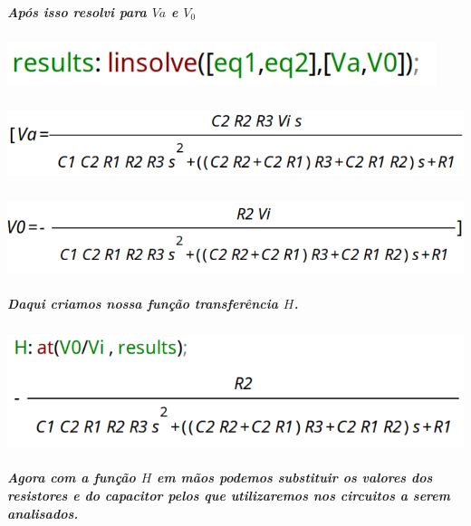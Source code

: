 \documentclass[12pt,twoside, a4paper, twocolumn]{article}
\begin{document}
\subparagraph*{Após isso resolvi para $Va$ e $V_0$}




\subparagraph*{}




\begin{adjustbox}{scale=0.4}
    \includegraphics{linsolve.png}
\end{adjustbox}


\subparagraph*{}


\begin{adjustbox}{scale=0.4}
    \includegraphics{va.png}
\end{adjustbox}


\subparagraph*{}


\begin{adjustbox}{scale=0.4}
    \includegraphics{v0.png}
\end{adjustbox}




\subparagraph*{Daqui criamos nossa função transferência $H$.}




\subparagraph*{}




\begin{adjustbox}{scale=0.4}
    \includegraphics{H.png}
\end{adjustbox}




\subparagraph*{Agora com a função $H$ em mãos podemos substituir os valores dos resistores e do capacitor pelos que utilizaremos nos circuitos a serem analisados.}
\end{document}
